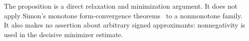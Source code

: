 The proposition is a direct relaxation and minimization argument.
It does not apply Simon's monotone form-convergence
theorems~\citep[Section~3]{simon1978canonical} to a nonmonotone family.
It also makes no assertion about arbitrary signed approximants:
nonnegativity is used in the decisive minimizer estimate.
